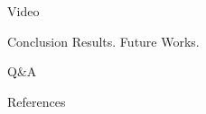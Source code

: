 \documentclass[10pt]{beamer}
\begin{document}
\begin{frame}[standout]
  Video
\end{frame}

\begin{frame}{Conclusion}
  Results. Future Works.
\end{frame}

\begin{frame}[standout]
    Q\&A
\end{frame}

\appendix

\begin{frame}{References}
  
  
\end{frame}
\end{document}

